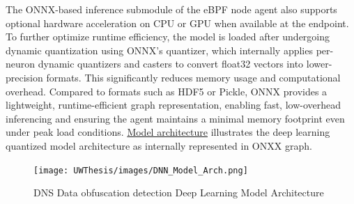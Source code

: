 \documentclass [11pt, proquest] {uwthesis}[2020/02/24]
\begin{document}
The ONNX-based inference submodule of the eBPF node agent also supports optional hardware acceleration on CPU or GPU when available at the endpoint. To further optimize runtime efficiency, the model is loaded after undergoing dynamic quantization using ONNX’s quantizer, which internally applies per-neuron dynamic quantizers and casters to convert float32 vectors into lower-precision formats. This significantly reduces memory usage and computational overhead. Compared to formats such as HDF5 or Pickle, ONNX provides a lightweight, runtime-efficient graph representation, enabling fast, low-overhead inferencing and ensuring the agent maintains a minimal memory footprint even under peak load conditions. \hyperref[sec:model_arch]{Model architecture} illustrates the deep learning quantized model architecture as internally represented in ONXX graph. 




\begin{figure}[H]
\texttt{[image: UWThesis/images/DNN\_Model\_Arch.png]}
\caption{DNS Data obfuscation detection Deep Learning Model Architecture}
\label{sec:model_arch}
\end{figure}
\end{document}
